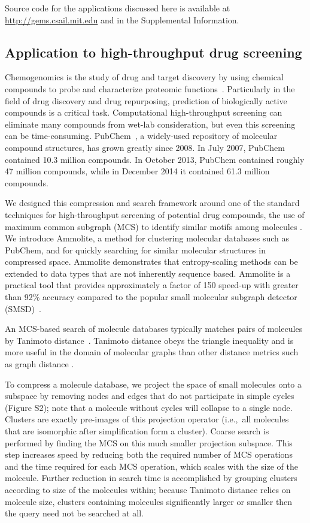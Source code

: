 \documentclass[11pt]{elsarticle}
\renewcommand{\cite}{\citep} %
\theoremstyle{definition}
\theoremstyle{remark}
\numberwithin{equation}{section}
\begin{document}
Source code for the applications discussed here is available at \url{http://gems.csail.mit.edu} and in the Supplemental Information.

\subsection{Application to high-throughput drug screening}

Chemogenomics is the study of drug and target discovery by using chemical
compounds to probe and characterize proteomic 
functions~\cite{bredel2004chemogenomics}.
Particularly in the field of drug discovery and drug repurposing, prediction 
of biologically active compounds is a critical task. 
Computational high-throughput screening can eliminate many compounds from 
wet-lab consideration, but even this screening can be time-consuming.
PubChem~\cite{bolton2008pubchem}, a widely-used repository of molecular compound 
structures, 
has grown greatly since 2008. 
In July 2007, PubChem contained 10.3 million compounds.
In October 2013, PubChem contained roughly 47 million compounds, while
in December 2014 it contained 61.3 million compounds.

We designed this compression and search framework around one of the standard 
techniques for high-throughput screening of potential drug compounds, the use 
of maximum common subgraph (MCS) to identify similar motifs among molecules \cite{cao2008maximum, rahman2009small}.
We introduce Ammolite, a method for clustering molecular databases such as 
PubChem, and for quickly searching for 
similar molecular structures in compressed space.
Ammolite demonstrates that entropy-scaling methods can be extended to data types that are not inherently sequence based.
Ammolite is a practical 
tool that provides approximately a factor of 150 speed-up with greater than 92\% accuracy compared to the popular small molecular subgraph detector (SMSD)~\cite{rahman2009small}.

An MCS-based search of molecule databases typically matches pairs of molecules by 
Tanimoto distance~\cite{rahman2009small}. 
Tanimoto distance obeys the triangle inequality and is more useful in the 
domain of molecular graphs than other
distance metrics such as graph distance \cite{bunke1998graph}.

To compress a molecule database, we project the space of small molecules onto a subspace by removing nodes and edges that do not participate in simple cycles
(Figure S2);
note that a molecule without cycles will collapse to a single node.
Clusters are exactly pre-images of this projection operator (i.e.,~all molecules that are isomorphic after simplification form a cluster).
Coarse search is performed by finding the MCS on this much smaller projection subspace.
This step increases speed by reducing both the required number of MCS operations 
and the time required for each MCS operation, which scales with the size of the molecule.
Further reduction in search time is accomplished by grouping clusters according
to size of the molecules within; because Tanimoto distance relies on molecule
size, clusters containing molecules significantly larger or smaller then the
query need not be searched at all.
\end{document}
